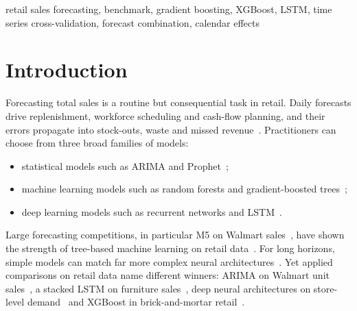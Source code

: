 \documentclass[conference]{IEEEtran}
\begin{document}
\begin{IEEEkeywords}
retail sales forecasting, benchmark, gradient boosting, XGBoost, LSTM, time series cross-validation, forecast combination, calendar effects
\end{IEEEkeywords}

\section{Introduction}
Forecasting total sales is a routine but consequential task in retail.
Daily forecasts drive replenishment, workforce scheduling and cash-flow planning, and their errors propagate into stock-outs, waste and missed revenue~\cite{fildes2022retail}.
Practitioners can choose from three broad families of models:
\begin{itemize}
\item statistical models such as ARIMA and Prophet~\cite{hyndman2021fpp3,taylor2018prophet};
\item machine learning models such as random forests and gradient-boosted trees~\cite{breiman2001rf,chen2016xgboost,ke2017lightgbm};
\item deep learning models such as recurrent networks and LSTM~\cite{hewamalage2021rnn}.
\end{itemize}
Large forecasting competitions, in particular M5 on Walmart sales~\cite{makridakis2022m5}, have shown the strength of tree-based machine learning on retail data~\cite{januschowski2022trees}.
For long horizons, simple models can match far more complex neural architectures~\cite{zeng2023transformers}.
Yet applied comparisons on retail data name different winners: ARIMA on Walmart unit sales~\cite{hasan2022comparative}, a stacked LSTM on furniture sales~\cite{ensafi2022seasonal}, deep neural architectures on store-level demand~\cite{theodoridis2025lstmixer} and XGBoost in brick-and-mortar retail~\cite{hobor2026comparative}.
\end{document}
